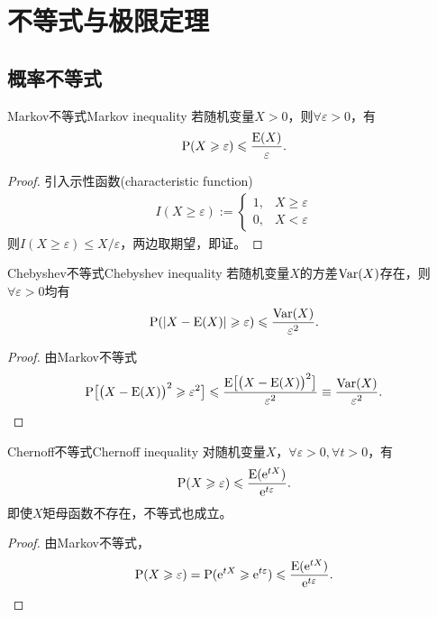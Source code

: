 \chapter{不等式与极限定理}

\section{概率不等式}
\begin{theorem}{Markov不等式}{Markov inequality}
	若随机变量$X>0$，则$\forall\varepsilon>0$，有
	\begin{equation}
		\label{eq:Markov ineq}
		\operatorname{P}(X\geqslant\varepsilon)\leqslant\frac{\operatorname{E}(X)}\varepsilon.
	\end{equation}
\end{theorem}
\begin{proof}
	引入示性函数(characteristic function)
	\begin{align*}
		I(X\geqslant\varepsilon):=\begin{cases}
			1,&X\geqslant\varepsilon\\
			0,&X<\varepsilon
		\end{cases}
	\end{align*}
	则$I(X\geqslant\varepsilon)\leqslant X/\varepsilon$，两边取期望，即证。
\end{proof}
\begin{theorem}{Chebyshev不等式}{Chebyshev inequality}
	若随机变量$X$的方差$\operatorname{Var}(X)$存在，则$\forall\varepsilon>0$均有
	\begin{align}
		\operatorname{P}(|X-\operatorname{E}(X)|\geqslant\varepsilon)\leqslant\frac{\operatorname{Var}(X)}{\varepsilon^2}.
	\end{align}
\end{theorem}
\begin{proof}
	由Markov不等式
	\begin{align*}
		\operatorname{P}\bigl[\bigl(X-\operatorname{E}(X)\bigr)^2\geqslant\varepsilon^2\bigr]\leqslant\frac{\operatorname{E}\bigl[\bigl(X-\operatorname{E}(X)\bigr)^2\bigr]}{\varepsilon^2}\equiv\frac{\operatorname{Var}(X)}{\varepsilon^2}.
		\qedhere
	\end{align*}
\end{proof}
\begin{theorem}{Chernoff不等式}{Chernoff inequality}
	对随机变量$X$，$\forall\varepsilon>0,\forall t>0$，有
	\begin{align}
		\operatorname{P}(X\geqslant\varepsilon)\leqslant\frac{\operatorname{E}(\mathop{}\!\mathrm{e}^{tX})}{\mathop{}\!\mathrm{e}^{t\varepsilon}}.
	\end{align}
	即使$X$矩母函数不存在，不等式也成立。
\end{theorem}
\begin{proof}
	由Markov不等式，
	\begin{align*}
		\operatorname{P}(X\geqslant\varepsilon)=\operatorname{P}(\mathop{}\!\mathrm{e}^{tX}\geqslant\mathop{}\!\mathrm{e}^{t\varepsilon})\leqslant\frac{\operatorname{E}(\mathop{}\!\mathrm{e}^{tX})}{\mathop{}\!\mathrm{e}^{t\varepsilon}}.
	\end{align*}
\end{proof}
